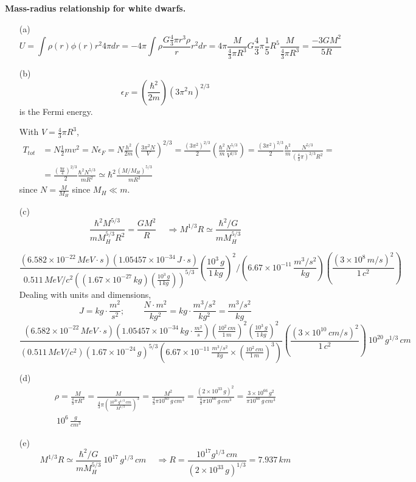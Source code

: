 \documentclass[twoside]{amsart}
\theoremstyle{plain}
\theoremstyle{definition}
\newcommand{\solutionhead}[1]
  {
   \noindent{\small\bf Solution #1.}
   }
\begin{document}
\solutionhead{6} \textbf{Mass-radius relationship for white dwarfs.}  
\begin{itemize}
\item[(a)] 
\[
U  = \int \rho(r) \phi(r) r^2 4\pi dr = -4\pi \int \rho \frac{ G \frac{4}{3} \pi r^3 \rho }{r} r^2 dr = 4\pi \frac{M }{ \frac{4}{3} \pi R^3 } G \frac{4}{3} \pi  \frac{1}{5} R^5 \frac{M}{ \frac{4}{3} \pi R^3} = \boxed{ \frac{-3 GM^2}{5R} }
\]
\item[(b)] \[
\epsilon_F = \left( \frac{\hbar^2}{2m} \right) (3\pi^2 n )^{2/3}
\]
is the Fermi energy.  

With $V = \frac{4}{3} \pi R^3$, 
\[
\begin{aligned}
T_{tot} & = N \frac{1}{2} m v^2 = N \epsilon_F = N \frac{h^2}{2m} \left( \frac{3\pi^2 N }{V} \right)^{2/3} = \frac{ (3\pi^2)^{2/3} }{ 2} \left( \frac{\hbar^2}{m} \frac{ N^{5/3} }{ V^{2/3}} \right) = \frac{(3\pi^2 )^{2/3} }{2} \frac{\hbar^2}{m} \frac{N^{5/3}}{ \left( \frac{4}{3} \pi \right)^{2/3} R^2}  = \\
 & = \frac{ \left( \frac{ 9 \pi }{4} \right)^{2/3} }{ 2} \frac{ \hbar^2 N^{5/3}}{ mR^2 } \simeq \hbar^2 \frac{ ( M/M_H)^{5/3} }{ mR^2}
\end{aligned}
\]
since $N = \frac{M}{M_H}$ since $M_H \ll m$.  
\item[(c)] 
\[
\frac{\hbar^2  M^{5/3} }{ m M_H^{5/3} R^2} = \frac{GM^2}{R} \quad \, \Longrightarrow M^{1/3} R \simeq \frac{ \hbar^2 /G }{ m M_H^{5/3} }
\] 

\[
\frac{ ( 6.582 \times 10^{-22} \, MeV\cdot s)( 1.05457 \times 10^{-34} \, J \cdot s ) }{ 0.511 \, MeV/c^2 ( ( 1.67 \times 10^{-27} \, kg  ) \left( \frac{  10^3 \, g }{ 1 \, kg} \right) )^{5/3} } \left( \frac{ 10^3 \, g}{ 1 \, kg } \right)^2 / (6.67 \times 10^{-11} \, \frac{ m^3/s^2}{ kg } ) \left( \frac{ (3\times 10^8 \, m/s )^2}{ 1\, c^2} \right) 
\]
Dealing with units and dimensions,
\[
J = kg \cdot \frac{m^2}{s^2}; \quad \quad \, \frac{N \cdot m^2}{kg^2} = kg \cdot \frac{m^3/s^2}{kg^2} = \frac{ m^3/s^2}{ kg }
\]
\[
\frac{ (6.582 \times 10^{-22} \, MeV \cdot s )( 1.05457 \times 10^{-34} \, kg \cdot \frac{m^2}{s} ) \left( \frac{10^2 \, cm}{ 1 \, m } \right)^2 \left( \frac{ 10^3 \, g }{ 1 \, kg } \right)^2 }{ (0.511 \, MeV/c^2 )( 1.67 \times 10^{-24} \, g )^{5/3} (6.67 \times 10^{-11} \, \frac{m^3/s^2}{ kg} \times \left( \frac{10^2 \, cm}{ 1 \, m } \right)^3 ) } \left( \frac{ (3\times 10^{10} \, cm/s )^2}{ 1 \, c^2} \right) ~ 10^{20} \, g^{1/3} \, cm
\]
\item[(d)] \[
\begin{gathered}
  \rho = \frac{M}{ \frac{4}{3} \pi R^3} = \frac{ M }{ \frac{4}{3} \pi \left( \frac{ 10^{20} \, g^{1/3} \, cm }{ M^{1/3} } \right)^3 } = \frac{M^2}{ \frac{4}{3} \pi 10^{60} \, g \, cm^3 } = \frac{ ( 2 \times 10^{33} \, g)^2}{ \frac{4}{3} \pi 10^{60} \, g \, cm^3 } = \frac{ 3 \times 10^{66} \, g^2 }{ \pi 10^{60} \, g \, cm^3} \\
  ~ 10^6 \, \frac{g}{cm^3}
\end{gathered}
\] 
\item[(e)] \[
M^{1/3} R \simeq \frac{ \hbar^2/G }{ m M_H^{5/3}} ~ 10^{17} \, g^{1/3} \, cm \quad \, \Longrightarrow R = \frac{ 10^{17} g^{1/3} \, cm }{ (2\times 10^{33} \, g)^{1/3} } = 7.937 \, km
\]
\end{itemize}
\end{document}
